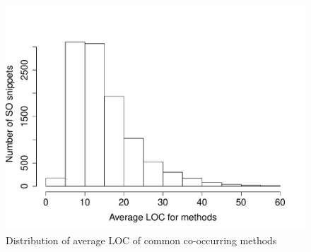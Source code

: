 \begin{figure}
	\includegraphics[scale=0.4]{figures/dist-loc.pdf}
	\caption{Distribution of average LOC of common co-occurring methods}
	\label{fig:avg-loc}
\end{figure}


